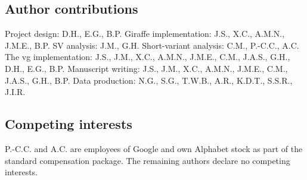 \documentclass[11pt]{ucscthesis}
\begin{document}
\subsection{Author contributions}
Project design: D.H., E.G., B.P. Giraffe implementation: J.S., X.C., A.M.N., J.M.E., B.P. SV analysis: J.M., G.H. Short-variant analysis: C.M., P.-C.C., A.C. The vg implementation: J.S., J.M., X.C., A.M.N., J.M.E., C.M., J.A.S., G.H., D.H., E.G., B.P. Manuscript writing: J.S., J.M., X.C., A.M.N., J.M.E., C.M., J.A.S., G.H., B.P. Data production: N.G., S.G., T.W.B., A.R., K.D.T., S.S.R., J.I.R.

\subsection{Competing interests}
 P.-C.C. and A.C. are employees of Google and own Alphabet stock as part of the standard compensation package. The remaining authors declare no competing interests.
\end{document}
